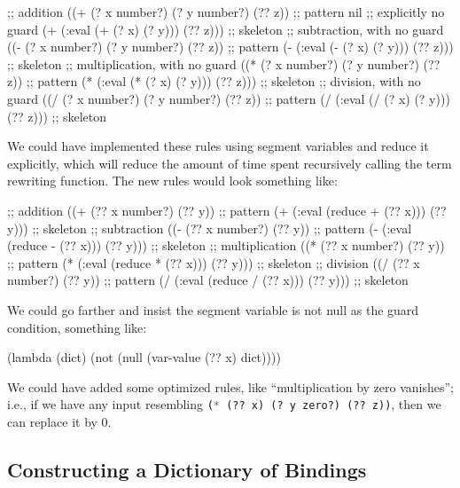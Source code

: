 \begin{lisp-example}
  ;; addition
  ((+ (? x number?) (? y number?) (?? z)) ;; pattern
   nil                                    ;; explicitly no guard
   (+ (:eval (+ (? x) (? y))) (?? z)))    ;; skeleton
  ;; subtraction, with no guard
  ((- (? x number?) (? y number?) (?? z)) ;; pattern
   (- (:eval (- (? x) (? y))) (?? z)))    ;; skeleton
  ;; multiplication, with no guard
  ((* (? x number?) (? y number?) (?? z)) ;; pattern
   (* (:eval (* (? x) (? y))) (?? z)))    ;; skeleton
  ;; division, with no guard
  ((/ (? x number?) (? y number?) (?? z)) ;; pattern
   (/ (:eval (/ (? x) (? y))) (?? z)))    ;; skeleton
\end{lisp-example}

\begin{remark}
We could have implemented these rules using segment variables and reduce
it explicitly, which will reduce the amount of time spent recursively
calling the term rewriting function. The new rules would look something like:
\begin{lisp-example}
  ;; addition
  ((+ (?? x number?) (?? y))              ;; pattern
   (+ (:eval (reduce + (?? x))) (?? y)))  ;; skeleton
  ;; subtraction
  ((- (?? x number?) (?? y))              ;; pattern
   (- (:eval (reduce - (?? x))) (?? y)))  ;; skeleton
  ;; multiplication
  ((* (?? x number?) (?? y))              ;; pattern
   (* (:eval (reduce * (?? x))) (?? y)))  ;; skeleton
  ;; division
  ((/ (?? x number?) (?? y))              ;; pattern
   (/ (:eval (reduce / (?? x))) (?? y)))  ;; skeleton
\end{lisp-example}
We could go farther and insist the segment variable is not null as the
guard condition, something like:
\begin{lisp-example}
(lambda (dict) (not (null (var-value (?? x) dict))))
\end{lisp-example}
\end{remark}

\begin{remark}
We could have added some optimized rules, like ``multiplication by zero
vanishes''; i.e., if we have any input
resembling \lstinline[language=lisp]{(* (?? x) (? y zero?) (?? z))},
then we can replace it by $0$.
\end{remark}

\subsection{Constructing a Dictionary of Bindings}

